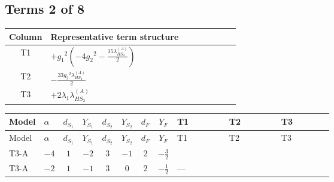 \documentclass[8pt]{article}
\begin{document}
\begin{landscape}
\subsection*{Terms 2 of 8}
\begin{center}
\begin{tabular}{@{}c >{\raggedright\arraybackslash}p{0.82\linewidth}@{}}
\toprule
Column & Representative term structure \\
\midrule
T1 & \(\displaystyle +{g_1}^2 \left(-4 {g_2}^2-\frac{15 {\lambda_{HS_2}^{(A)}}}{2}\right)\) \\
\midrule
T2 & \(\displaystyle -\frac{33 {g_2}^2 {\lambda_{HS_2}^{(A)}}}{2}\) \\
\midrule
T3 & \(\displaystyle +2 {\lambda_1} {\lambda_{HS_2}^{(A)}}\) \\
\midrule
\bottomrule
\end{tabular}
\end{center}
\smallskip
\tiny
\begin{longtable}{@{}llcccccc >{\raggedright\arraybackslash}p{0.21\linewidth} >{\raggedright\arraybackslash}p{0.21\linewidth} >{\raggedright\arraybackslash}p{0.21\linewidth}@{}}
\toprule
Model & $\alpha$ & $d_{S_1}$ & $Y_{S_1}$ & $d_{S_2}$ & $Y_{S_2}$ & $d_F$ & $Y_F$ & T1 & T2 & T3 \\
\midrule
\endfirsthead
\toprule
Model & $\alpha$ & $d_{S_1}$ & $Y_{S_1}$ & $d_{S_2}$ & $Y_{S_2}$ & $d_F$ & $Y_F$ & T1 & T2 & T3 \\
\midrule
\endhead
T3-A & $-4$ & $1$ & $-2$ & $3$ & $-1$ & $2$ & $-\frac{3}{2}$ & \scriptsize\adjustbox{max width=\linewidth}{$\begin{gathered} +{g_1}^2 \left(-4 {g_2}^2-\frac{15 {\lambda_{HS_2}^{(A)}}}{2}\right)\end{gathered}$} & \scriptsize\adjustbox{max width=\linewidth}{$\begin{gathered} -\frac{33 {g_2}^2 {\lambda_{HS_2}^{(A)}}}{2}\end{gathered}$} & \scriptsize\adjustbox{max width=\linewidth}{$\begin{gathered} +2 {\lambda_1} {\lambda_{HS_2}^{(A)}}\end{gathered}$} \\
\midrule
T3-A & $-2$ & $1$ & $-1$ & $3$ & $0$ & $2$ & $-\frac{1}{2}$ & --- & \scriptsize\adjustbox{max width=\linewidth}{$\begin{gathered} -\frac{33 {g_2}^2 {\lambda_{HS_2}^{(A)}}}{2}\end{gathered}$} & \scriptsize\adjustbox{max width=\linewidth}{$\begin{gathered} +2 {\lambda_1} {\lambda_{HS_2}^{(A)}}\end{gathered}$} \\

\end{longtable}
\end{landscape}
\end{document}

